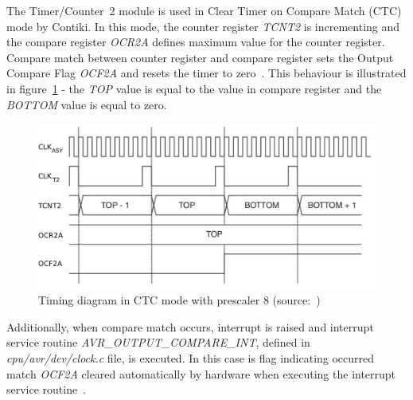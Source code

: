 
The Timer/Counter~2 module is used in Clear Timer on Compare Match (CTC) mode by Contiki.
In this mode, the counter register {\it{TCNT2}} is incrementing
and the compare register {\it{OCR2A}} defines maximum value for the counter register.
Compare match between counter register and compare register
sets the Output Compare Flag {\it{OCF2A}} and resets the timer to zero~\cite{avr-datasheet}.
This behaviour is illustrated in figure~\ref{fig:design-timing-diagram}
- the {\it{TOP}} value is equal to the value in compare register and the {\it{BOTTOM}} value is equal to zero.

\begin{figure}
  \centering
  \includegraphics[width=12cm,keepaspectratio]{fig/timing-diagram.pdf}
  \caption{Timing diagram in CTC mode with prescaler 8 (source:~\cite{avr-datasheet})}
  \label{fig:design-timing-diagram}
\end{figure}

Additionally, when compare match occurs,
interrupt is raised and interrupt service routine {\it{AVR\_OUTPUT\_COMPARE\_INT}},
defined in {\it{cpu/avr/dev/clock.c}} file, is executed.
In this case is flag indicating occurred match {\it{OCF2A}}
cleared automatically by hardware when executing
the interrupt service routine~\cite{avr-datasheet}.

